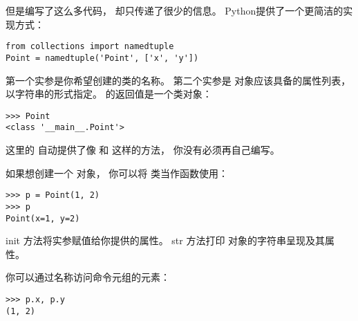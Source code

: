 
但是编写了这么多代码， 却只传递了很少的信息。
Python提供了一个更简洁的实现方式：

\begin{lstlisting}
from collections import namedtuple
Point = namedtuple('Point', ['x', 'y'])
\end{lstlisting}


第一个实参是你希望创建的类的名称。 第二个实参是  对象应该具备的属性列表， 以字符串的形式指定。   的返回值是一个类对象：

\begin{lstlisting}
>>> Point
<class '__main__.Point'>
\end{lstlisting}


这里的  自动提供了像  和  这样的方法， 你没有必须再自己编写。


如果想创建一个  对象， 你可以将  类当作函数使用：

\begin{lstlisting}
>>> p = Point(1, 2)
>>> p
Point(x=1, y=2)
\end{lstlisting}


init 方法将实参赋值给你提供的属性。
str 方法打印  对象的字符串呈现及其属性。


你可以通过名称访问命令元组的元素：

\begin{lstlisting}
>>> p.x, p.y
(1, 2)
\end{lstlisting}

